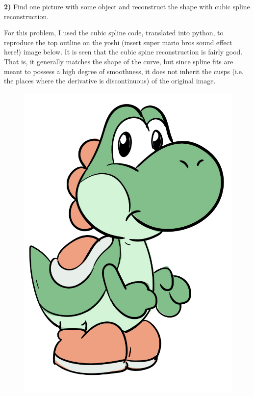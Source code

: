 \documentclass[12pt,a4paper]{article}
\newcommand{\prob}[2]{\textbf{#1)} #2}
\begin{document}
\prob{2}{Find one picture with some object and reconstruct the shape with cubic spline reconstruction.}

For this problem, I used the cubic spline code, translated into python, to reproduce the top outline on the yoshi (insert super mario bros sound effect here!) image below.
It is seen that the cubic spine reconstruction is fairly good.
That is, it generally matches the shape of the curve, but since spline fits are meant to possess a high degree of smoothness, it does not inherit the cusps (i.e. the places where the derivative is discontinuous) of the original image.

\begin{figure}[H]
    \begin{center}
        \includegraphics[scale=0.3]{./yoshi.jpg} 
    \end{center}
\end{figure}
\end{document}

